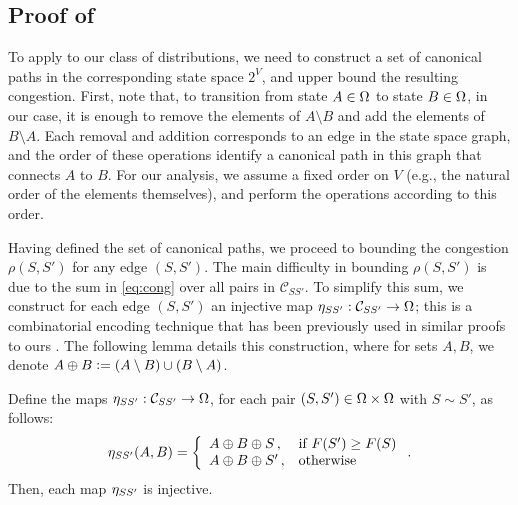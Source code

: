 \subsection{Proof of }
To apply  to our class of distributions, we need to construct a set of canonical paths in the corresponding state space $2^V$, and upper bound the resulting congestion.
First, note that, to transition from state $A \in \ss$ to state $B \in \ss$, in our case, it is enough to remove the elements of $A \setminus B$ and add the elements of $B \setminus A$.
Each removal and addition corresponds to an edge in the state space graph, and the order of these operations identify a canonical path in this graph that connects $A$ to $B$.
For our analysis, we assume a fixed order on $V$ (e.g., the natural order of the elements themselves), and perform the operations according to this order.

Having defined the set of canonical paths, we proceed to bounding the congestion $\rho(S, S')$ for any edge $(S, S')$.
The main difficulty in bounding $\rho(S, S')$ is due to the sum in \eqref{eq:cong} over all pairs in $\mathcal{C}_{SS'}$.
To simplify this sum, we construct for each edge $(S, S')$ an injective map $\ess : \mathcal{C}_{SS'} \to \ss$; this is a combinatorial encoding technique that has been previously used in similar proofs to ours \citep{jerrum03}.
The following lemma details this construction, where for sets $A, B$, we denote $A \oplus B \defeq (A \setminus B)\cup(B \setminus A)$.

\begin{lemma} \label{lem:inj}
Define the maps $\ess : \mathcal{C}_{SS'} \to \ss$, for each pair $(S, S') \in \ss \times \ss$ with $S \sim S'$, as follows:
\begin{align*}
  \ess(A, B) = \twopartdefo{A \oplus B \oplus S}{F(S') \geq F(S)}{A \oplus B \oplus S'}.
\end{align*}
Then, each map $\ess$ is injective.
\end{lemma}

